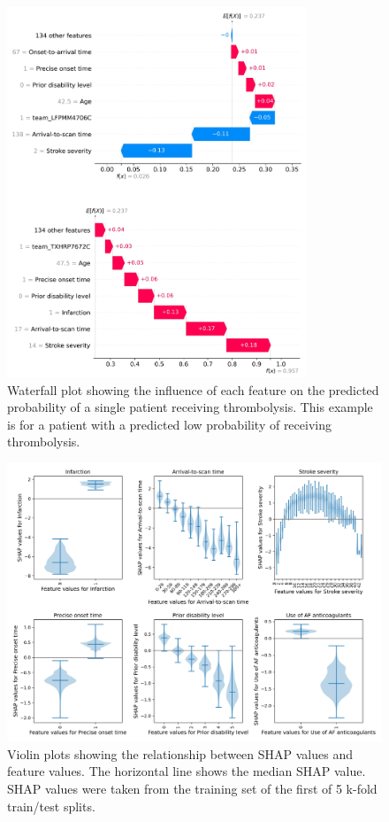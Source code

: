 \begin{figure}
\centering
\includegraphics[width=0.8\textwidth]{./images/waterfall}
\caption{Waterfall plot showing the influence of each feature on the predicted probability of a single patient receiving thrombolysis. This example is for a patient with a predicted low probability of receiving thrombolysis.}
\end{figure}

\begin{figure}
\centering
\includegraphics[width=1\textwidth]{./images/03_xgb_10_features_thrombolysis_shap_violin}
\caption{Violin plots showing the relationship between SHAP values and feature values. The horizontal line shows the median SHAP value. SHAP values were taken from the training set of the first of 5 k-fold train/test splits.}
\end{figure}

